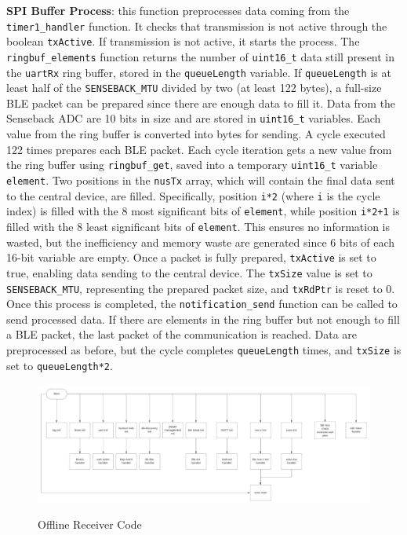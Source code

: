 \documentclass{Configuration_Files/PoliMi3i_thesis}
\begin{document}
\textbf{SPI Buffer Process}: this function preprocesses data coming from the \texttt{timer1\_handler} function. It checks that transmission is not active through the boolean \texttt{txActive}. If transmission is not active, it starts the process. The \texttt{ringbuf\_elements} function returns the number of \texttt{uint16\_t} data still present in the \texttt{uartRx} ring buffer, stored in the \texttt{queueLength} variable. If \texttt{queueLength} is at least half of the \texttt{SENSEBACK\_MTU} divided by two (at least 122 bytes), a full-size BLE packet can be prepared since there are enough data to fill it. Data from the Senseback ADC are 10 bits in size and are stored in \texttt{uint16\_t} variables. Each value from the ring buffer is converted into bytes for sending. A cycle executed 122 times prepares each BLE packet. Each cycle iteration gets a new value from the ring buffer using \texttt{ringbuf\_get}, saved into a temporary \texttt{uint16\_t} variable \texttt{element}. Two positions in the \texttt{nusTx} array, which will contain the final data sent to the central device, are filled. Specifically, position \texttt{i*2} (where \texttt{i} is the cycle index) is filled with the 8 most significant bits of \texttt{element}, while position \texttt{i*2+1} is filled with the 8 least significant bits of \texttt{element}. This ensures no information is wasted, but the inefficiency and memory waste are generated since 6 bits of each 16-bit variable are empty. Once a packet is fully prepared, \texttt{txActive} is set to true, enabling data sending to the central device. The \texttt{txSize} value is set to \texttt{SENSEBACK\_MTU}, representing the prepared packet size, and \texttt{txRdPtr} is reset to 0. Once this process is completed, the \texttt{notification\_send} function can be called to send processed data. If there are elements in the ring buffer but not enough to fill a BLE packet, the last packet of the communication is reached. Data are preprocessed as before, but the cycle completes \texttt{queueLength} times, and \texttt{txSize} is set to \texttt{queueLength*2}.

\begin{figure}[H]
	\includegraphics[scale=0.3]{Previous Implementation/Screenshot 2024-08-15 at 11.01.10.png}
	\centering
    \label{prev_5}
    \caption{Offline Receiver Code}
\end{figure}
\end{document}
